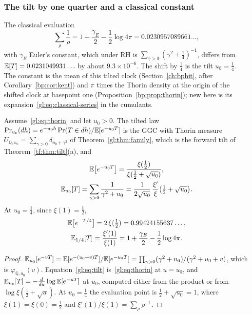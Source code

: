 \subsubsection{The tilt by one quarter and a classical constant}

The classical evaluation
\[
\sum_\rho\frac1\rho = 1+\frac{\gamma_E}{2}-\frac12\log4\pi = 0.0230957089661\ldots,
\]
with $\gamma_E$ Euler's constant, which under RH is $\sum_{\gamma>0}(\gamma^2+\tfrac14)^{-1}$, differs from $\mathbb{E}[T] = 0.0231049931\ldots$ by about $9.3\times10^{-6}$. The shift by $\tfrac14$ is the tilt $u_0=\tfrac14$. The constant is the mean of this tilted clock (Section~\ref{ch:bphit}, after Corollary~\ref{bp:cor:kent}) and $\pi$ times the Thorin density at the origin of the shifted clock at basepoint one (Proposition~\ref{bp:prop:thorin}); new here is its expansion~\eqref{gl:eq:classical-series} in the cumulants.

\begin{proposition}\label{gl:prop:tilt}
Assume~\eqref{gl:eq:thorin} and let $u_0>0$. The tilted law $\Pr_{u_0}(dh) = e^{-u_0h}\Pr(T\in dh)/\mathbb{E}[e^{-u_0T}]$ is the GGC with Thorin measure $U_{\mathbb Q,u_0}=\sum_{\gamma>0}\delta_{u_0+\gamma^2}$ of Theorem~\ref{gl:thm:family}, which is the forward tilt of Theorem~\ref{tf:thm:tilt}(a), and
\begin{gather}
\mathbb{E}\big[e^{-u_0T}\big] = \frac{\xi(\tfrac12)}{\xi(\tfrac12+\sqrt{u_0})},\label{gl:eq:tilt}\\
\mathbb{E}_{u_0}[T] = \sum_{\gamma>0}\frac{1}{\gamma^2+u_0} = \frac{1}{2\sqrt{u_0}}\,\frac{\xi'}{\xi}\big(\tfrac12+\sqrt{u_0}\big).\label{gl:eq:tiltmean}
\end{gather}
At $u_0=\tfrac14$, since $\xi(1)=\tfrac12$,
\begin{gather*}
\mathbb{E}\big[e^{-T/4}\big] = 2\,\xi(\tfrac12) = 0.99424155637\ldots,\\
\mathbb{E}_{1/4}[T] = \frac{\xi'(1)}{\xi(1)} = 1+\frac{\gamma_E}{2}-\frac12\log4\pi.
\end{gather*}
\end{proposition}

\begin{proof}
$\mathbb{E}_{u_0}[e^{-vT}] = \mathbb{E}[e^{-(u_0+v)T}]/\mathbb{E}[e^{-u_0T}] = \prod_{\gamma>0}(\gamma^2+u_0)/(\gamma^2+u_0+v)$, which is $\varphi_{\mathbb Q,u_0}(v)$. Equation~\eqref{gl:eq:tilt} is~\eqref{gl:eq:thorin} at $u=u_0$, and $\mathbb{E}_{u_0}[T] = -\tfrac{d}{du}\log\mathbb{E}[e^{-uT}]$ at $u_0$, computed either from the product or from $\log\xi(\tfrac12+\sqrt u)$. At $u_0=\tfrac14$ the evaluation point is $\tfrac12+\sqrt{u_0}=1$, where $\xi(1)=\xi(0)=\tfrac12$ and $\xi'(1)/\xi(1)=\sum_\rho\rho^{-1}$.
\end{proof}

